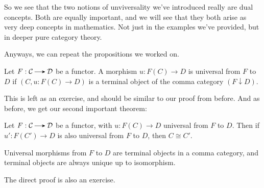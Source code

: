     So we see that the two notions of unviversality we've introduced really 
    are dual concepts. Both are equally important, and we will see that they both arise 
    as very deep concepts in mathematics. Not just in the examples we've provided, 
    but in deeper pure category theory. 
    
    Anyways, we can repeat the propositions we worked on.

    \begin{proposition}\label{proposition:universal_elements_in_comma_cats}
        Let $F: \cc \to \dd$ be a functor.  A morphism $u: F(C) \to D$
        is universal from $F$ to $D$ if $(C, u: F(C) \to D)$ is a terminal
        object of the comma category $(F \downarrow D)$. 
    \end{proposition}

    This is left as an exercise, and should be similar to our proof from before.
    And as before, we get our second important theorem:
    
    \begin{theorem}\label{theorem:couniversal_elements_isomorphic}
        Let $F: \cc \to \dd$ be a functor, with $u: F(C) \to D$ universal 
        from $F$ to $D$. Then if $u': F(C') \to D$ is also universal from $F$ to $D$, then 
        $C \cong C'$. 
    \end{theorem}

    \begin{prf}
        Universal morphisms from $F$ to $D$ are terminal objects in a comma category, and terminal 
        objects are always unique up to isomorphism.
    \end{prf}

    The direct proof is also an exercise. 
    \vspace{0.5cm}

